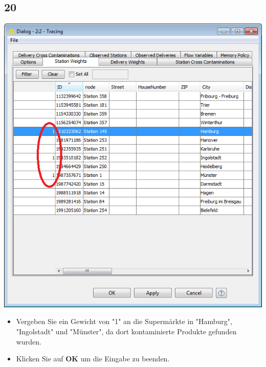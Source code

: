 \documentclass{beamer}
\begin{document}
\subsection{20}
\begin{frame}
	\begin{center}
  		\includegraphics[height=0.6\textheight]{20.png}
	\end{center}
	\begin{itemize}
		\item Vergeben Sie ein Gewicht von "1" an die Supermärkte in "Hamburg", "Ingolstadt" und "Münster", da dort kontaminierte Produkte gefunden wurden.
		\item Klicken Sie auf \textbf{OK} um die Eingabe zu beenden.
	\end{itemize}
\end{frame}
\end{document}
